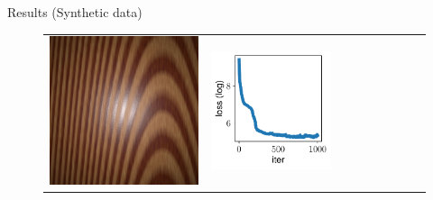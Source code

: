 \documentclass[final]{beamer}
\newlength{\twocolwid}
\newlength{\resultwidth}
\begin{document}
\begin{frame}[t]
\begin{columns}[t]
\begin{column}{\twocolwid}
\begin{block}{Results (Synthetic data)}
\begin{figure}[t]
\begin{tabular}{ccrclcccc}
            		\includegraphics[width=\resultwidth]{synth/wood/target.jpg} &
            		\includegraphics[width=\resultwidth]{synth/wood/loss.pdf} &

\end{tabular}
\end{figure}
\end{block}
\end{column}
\end{columns}
\end{frame}
\end{document}
